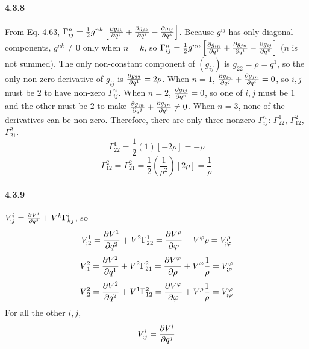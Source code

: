 \documentclass[a4paper]{article}
\begin{document}
\paragraph{4.3.8}
From Eq. 4.63, $\Gamma^n_{ij}=\frac{1}{2}g^{nk}\left[\frac{\partial g_{ik}}{\partial q^j}+\frac{\partial g_{jk}}{\partial q^i}-\frac{\partial g_{ij}}{\partial q^k} \right]$. Because $g^{ij}$ has only diagonal components, $g^{nk}\neq0$ only when $n=k$, so $\Gamma^n_{ij}=\frac{1}{2}g^{nn}\left[\frac{\partial g_{in}}{\partial q^j}+\frac{\partial g_{jn}}{\partial q^i}-\frac{\partial g_{ij}}{\partial q^n} \right]$ ($n$ is not summed). The only non-constant component of $(g_{ij})$ is $g_{22}=\rho=q^1$, so the only non-zero derivative of $g_{ij}$ is $\frac{\partial g_{22}}{\partial q^1}=2\rho$. When $n=1$, $\frac{\partial g_{in}}{\partial q^j}+\frac{\partial g_{jn}}{\partial q^i}=0$, so $i,j$ must be $2$ to have non-zero $\Gamma^n_{ij}$. When $n=2$, $\frac{\partial g_{ij}}{\partial q^n}=0$, so one of $i,j$ must be $1$ and the other must be $2$ to make $\frac{\partial g_{in}}{\partial q^j}+\frac{\partial g_{jn}}{\partial q^i}\neq0$. When $n=3$, none of the derivatives can be non-zero.
Therefore, there are only three nonzero $\Gamma^n_{ij}$: $\Gamma^1_{22}$, $\Gamma^2_{12}$, $\Gamma^2_{21}$.
\[
\Gamma^1_{22}=\frac{1}{2}(1)[-2\rho]=-\rho
\]
\[
\Gamma^2_{12}=\Gamma^2_{21}=\frac{1}{2}(\frac{1}{{\rho}^2})[2\rho]=\frac{1}{\rho}
\]

\paragraph{4.3.9}
$V^i_{;j}=\frac{\partial V^i}{\partial q^j}+V^k\Gamma^i_{kj}$, so 
\[
V^1_{;2}=\frac{\partial V^1}{\partial q^2}+V^2\Gamma^1_{22}=\frac{\partial V^\rho}{\partial\varphi}-V^\varphi\rho=V^\rho_{;\varphi}
\]
\[
V^2_{;1}=\frac{\partial V^2}{\partial q^1}+V^2\Gamma^2_{21}=\frac{\partial V^\varphi}{\partial\rho}+V^\varphi\frac{1}{\rho}=V^\varphi_{;\rho}
\]
\[
V^2_{;2}=\frac{\partial V^2}{\partial q^2}+V^1\Gamma^2_{12}=\frac{\partial V^\varphi}{\partial\varphi}+V^\rho\frac{1}{\rho}=V^\varphi_{;\varphi}
\]
For all the other $i,j$,
\[
V^i_{;j}=\frac{\partial V^i}{\partial q^j}
\]
\end{document}
